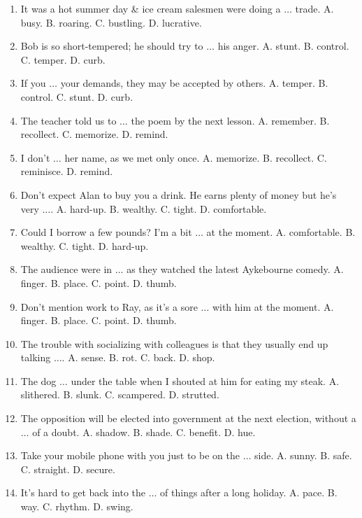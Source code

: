 \documentclass{article}
\numberwithin{equation}{section}
\begin{document}
\begin{enumerate}[leftmargin=2mm]
	\item It was a hot summer day \& ice cream salesmen were doing a $\ldots$ trade. {\sf A.} busy. {\sf B.} roaring. {\sf C.} bustling. {\sf D.} lucrative.
	\item Bob is so short-tempered; he should try to $\ldots$ his anger. {\sf A.} stunt. {\sf B.} control. {\sf C.} temper. {\sf D.} curb.
	\item If you $\ldots$ your demands, they may be accepted by others. {\sf A.} temper. {\sf B.} control. {\sf C.} stunt. {\sf D.} curb.
	\item The teacher told us to $\ldots$ the poem by the next lesson. {\sf A.} remember. {\sf B.} recollect. {\sf C.} memorize. {\sf D.} remind.
	\item I don't $\ldots$ her name, as we met only once. {\sf A.} memorize. {\sf B.} recollect. {\sf C.} reminisce. {\sf D.} remind.
	\item Don't expect Alan to buy you a drink. He earns plenty of money but he's very $\ldots$. {\sf A.} hard-up. {\sf B.} wealthy. {\sf C.} tight. {\sf D.} comfortable.
	\item Could I borrow a few pounds? I'm a bit $\ldots$ at the moment. {\sf A.} comfortable. {\sf B.} wealthy. {\sf C.} tight. {\sf D.} hard-up.
	\item The audience were in $\ldots$ as they watched the latest Aykebourne comedy. {\sf A.} finger. {\sf B.} place. {\sf C.} point. {\sf D.} thumb.
	\item Don't mention work to Ray, as it's a sore $\ldots$ with him at the moment. {\sf A.} finger. {\sf B.} place. {\sf C.} point. {\sf D.} thumb.
	\item The trouble with socializing with colleagues is that they usually end up talking $\ldots$. {\sf A.} sense. {\sf B.} rot. {\sf C.} back. {\sf D.} shop.
	\item The dog $\ldots$ under the table when I shouted at him for eating my steak. {\sf A.} slithered. {\sf B.} slunk. {\sf C.} scampered. {\sf D.} strutted.
	\item The opposition will be elected into government at the next election, without a $\ldots$ of a doubt. {\sf A.} shadow. {\sf B.} shade. {\sf C.} benefit. {\sf D.} hue.
	\item Take your mobile phone with you just to be on the $\ldots$ side. {\sf A.} sunny. {\sf B.} safe. {\sf C.} straight. {\sf D.} secure.
	\item It's hard to get back into the $\ldots$ of things after a long holiday. {\sf A.} pace. {\sf B.} way. {\sf C.} rhythm. {\sf D.} swing.

\end{enumerate}
\end{document}
